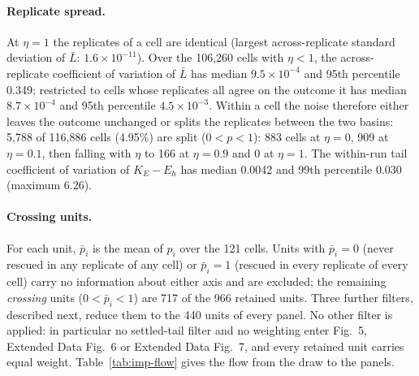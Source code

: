 \documentclass[11pt]{article}
\begin{document}
\paragraph{Replicate spread.}
At $\eta = 1$ the replicates of a cell are identical (largest across-replicate
standard deviation of $\bar L$: $1.6\times10^{-11}$). Over the 106,260 cells with $\eta < 1$, the
across-replicate coefficient of variation of $\bar L$ has median $9.5\times10^{-4}$
and 95th percentile 0.349; restricted to cells whose replicates all agree on the
outcome it has median $8.7\times10^{-4}$ and 95th percentile $4.5\times10^{-3}$. Within a cell the noise therefore either leaves the outcome unchanged
or splits the replicates between the two basins: 5,788 of 116,886 cells
(4.95\%) are split ($0 < p < 1$): 883 cells at $\eta = 0$, 909 at $\eta = 0.1$, then
falling with $\eta$ to 166 at $\eta = 0.9$ and 0 at $\eta = 1$. The within-run tail
coefficient of variation of $K_E - E_h$ has median 0.0042 and 99th percentile
0.030 (maximum 6.26).

\paragraph{Crossing units.}
For each unit, $\bar p_i$ is the mean of $p_i$ over the 121 cells. Units with
$\bar p_i = 0$ (never rescued in any replicate of any cell) or $\bar p_i = 1$
(rescued in every replicate of every cell) carry no information about either
axis and are excluded; the remaining \emph{crossing} units ($0 < \bar p_i < 1$)
are 717 of the 966 retained units. Three further filters, described next, reduce
them to the 440 units of every panel. No other filter is applied: in particular
no settled-tail filter and no weighting enter Fig.~5, Extended Data Fig.~6 or
Extended Data Fig.~7, and every retained unit carries equal weight.
Table~\ref{tab:imp-flow} gives the flow from the draw to the panels.
\end{document}
